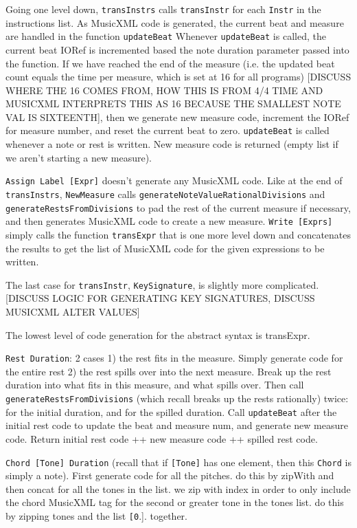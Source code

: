 \documentclass{report}
\begin{document}
Going one level down, \verb.transInstrs. calls \verb.transInstr. for each \verb.Instr. in the instructions list. As MusicXML code is generated, the current beat and measure are handled in the function \verb.updateBeat. Whenever \verb.updateBeat. is called, the current beat IORef is incremented based the note duration parameter passed into the function. If we have reached the end of the measure (i.e. the updated beat count equals the time per measure, which is set at 16 for all programs) [DISCUSS WHERE THE 16 COMES FROM, HOW THIS IS FROM 4/4 TIME AND MUSICXML INTERPRETS THIS AS 16 BECAUSE THE SMALLEST NOTE VAL IS SIXTEENTH], then we generate new measure code, increment the IORef for measure number, and reset the current beat to zero. \verb.updateBeat. is called whenever a note or rest is written. New measure code is returned (empty list if we aren't starting a new measure).

\verb.Assign Label [Expr]. doesn't generate any MusicXML code. Like at the end of \verb.transInstrs., \verb.NewMeasure. calls \verb.generateNoteValueRationalDivisions. and \verb.generateRestsFromDivisions. to pad the rest of the current measure if necessary, and then generates MusicXML code to create a new measure. \verb.Write [Exprs]. simply calls the function \verb.transExpr. that is one more level down and concatenates the results to get the list of MusicXML code for the given expressions to be written. 

The last case for \verb.transInstr., \verb.KeySignature., is slightly more complicated.
[DISCUSS LOGIC FOR GENERATING KEY SIGNATURES, DISCUSS MUSICXML ALTER VALUES]

The lowest level of code generation for the abstract syntax is transExpr.

\verb.Rest Duration.: 2 cases
1) the rest fits in the measure. Simply generate code for the entire rest
2) the rest spills  over into the  next measure. Break up the rest duration into what fits in this measure, and what  spills over. Then call \verb.generateRestsFromDivisions. (which recall breaks up the rests rationally) twice: for the initial duration, and for the spilled duration. Call \verb.updateBeat. after the initial rest code to update the beat and measure num, and generate new measure code. Return initial rest code ++ new measure code ++ spilled rest code. 

\verb.Chord [Tone] Duration. (recall that if \verb.[Tone]. has one element, then this \verb.Chord. is simply a note). First generate code for all the pitches. do this by zipWith and then concat for all the tones in the list. we zip with index in order  to only include the chord MusicXML tag for the second or greater tone in the tones list. do this by zipping tones and the list \verb.[0..]. together.
\end{document}
